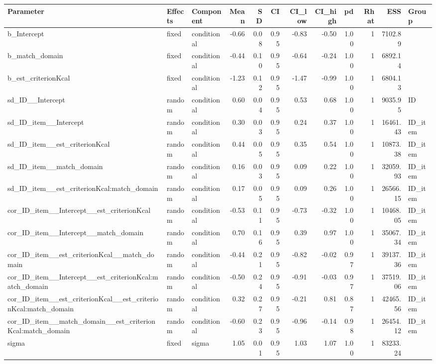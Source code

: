 \documentclass[
  letterpaper,
  DIV=11,
  numbers=noendperiod]{scrartcl}
\begin{document}
\begin{longtable*}[t]{lllrrrrrrrrl}
\toprule
Parameter & Effects & Component & Mean & SD & CI & CI\_low & CI\_high & pd & Rhat & ESS & Group\\
\midrule
b\_Intercept & fixed & conditional & -0.66 & 0.08 & 0.95 & -0.83 & -0.50 & 1.00 & 1 & 7102.89 & \\
b\_match\_domain & fixed & conditional & -0.44 & 0.10 & 0.95 & -0.64 & -0.24 & 1.00 & 1 & 6892.14 & \\
b\_est\_criterionKcal & fixed & conditional & -1.23 & 0.12 & 0.95 & -1.47 & -0.99 & 1.00 & 1 & 6804.13 & \\
sd\_ID\_\_Intercept & random & conditional & 0.60 & 0.04 & 0.95 & 0.53 & 0.68 & 1.00 & 1 & 9035.95 & ID\\
sd\_ID\_item\_\_Intercept & random & conditional & 0.30 & 0.03 & 0.95 & 0.24 & 0.37 & 1.00 & 1 & 16461.43 & ID\_item\\
\addlinespace
sd\_ID\_item\_\_est\_criterionKcal & random & conditional & 0.44 & 0.05 & 0.95 & 0.35 & 0.54 & 1.00 & 1 & 10873.38 & ID\_item\\
sd\_ID\_item\_\_match\_domain & random & conditional & 0.16 & 0.03 & 0.95 & 0.09 & 0.22 & 1.00 & 1 & 32059.93 & ID\_item\\
sd\_ID\_item\_\_est\_criterionKcal:match\_domain & random & conditional & 0.17 & 0.05 & 0.95 & 0.09 & 0.26 & 1.00 & 1 & 26566.15 & ID\_item\\
cor\_ID\_item\_\_Intercept\_\_est\_criterionKcal & random & conditional & -0.53 & 0.11 & 0.95 & -0.73 & -0.32 & 1.00 & 1 & 10468.05 & ID\_item\\
cor\_ID\_item\_\_Intercept\_\_match\_domain & random & conditional & 0.70 & 0.16 & 0.95 & 0.39 & 0.97 & 1.00 & 1 & 35067.34 & ID\_item\\
\addlinespace
cor\_ID\_item\_\_est\_criterionKcal\_\_match\_domain & random & conditional & -0.44 & 0.21 & 0.95 & -0.82 & -0.02 & 0.97 & 1 & 39137.36 & ID\_item\\
cor\_ID\_item\_\_Intercept\_\_est\_criterionKcal:match\_domain & random & conditional & -0.50 & 0.24 & 0.95 & -0.91 & -0.03 & 0.97 & 1 & 37519.06 & ID\_item\\
cor\_ID\_item\_\_est\_criterionKcal\_\_est\_criterionKcal:match\_domain & random & conditional & 0.32 & 0.27 & 0.95 & -0.21 & 0.81 & 0.87 & 1 & 42465.56 & ID\_item\\
cor\_ID\_item\_\_match\_domain\_\_est\_criterionKcal:match\_domain & random & conditional & -0.60 & 0.23 & 0.95 & -0.96 & -0.14 & 0.98 & 1 & 26454.12 & ID\_item\\
sigma & fixed & sigma & 1.05 & 0.01 & 0.95 & 1.03 & 1.07 & 1.00 & 1 & 83233.24 & \\
\bottomrule
\end{longtable*}
\end{document}
